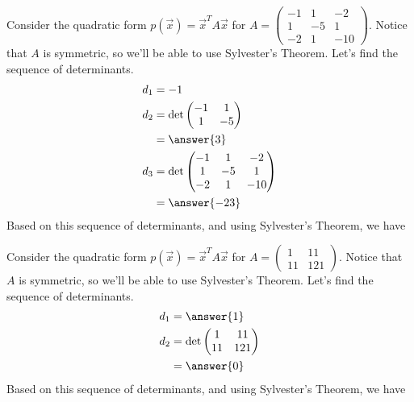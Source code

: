 \documentclass{ximera}
\begin{document}
\begin{example}
Consider the quadratic form $p(\vec{x}) = \vec{x}^T A\vec{x}$ for $A = \begin{pmatrix} -1 & 1 & -2\\ 1 & -5 & 1 \\ -2 & 1 & -10\end{pmatrix}$. Notice that $A$ is symmetric, so we'll be able to use Sylvester's Theorem. Let's find the sequence of determinants.
\begin{align*}
d_1 &= -1\\
d_2 &= \text{det}\begin{pmatrix} -1 & 1\\1 & -5\end{pmatrix}\\
&= \answer{3}\\
d_3 &= \text{det}\begin{pmatrix} -1 & 1 & -2\\ 1 & -5 & 1 \\ -2 & 1 & -10\end{pmatrix}\\
&= \answer{-23}
\end{align*}
Based on this sequence of determinants, and using Sylvester's Theorem, we have
\begin{multipleChoice}
\end{multipleChoice}
\end{example}

\begin{example}
Consider the quadratic form $p(\vec{x}) = \vec{x}^T A\vec{x}$ for $A = \begin{pmatrix} 1 & 11\\ 11 & 121\end{pmatrix}$. Notice that $A$ is symmetric, so we'll be able to use Sylvester's Theorem. Let's find the sequence of determinants.
\begin{align*}
d_1 &= \answer{1}\\
d_2 &= \text{det}\begin{pmatrix} 1 & 11\\11 & 121\end{pmatrix}\\
&= \answer{0}
\end{align*}
Based on this sequence of determinants, and using Sylvester's Theorem, we have
\begin{multipleChoice}
\end{multipleChoice}
\end{example}
\end{document}

